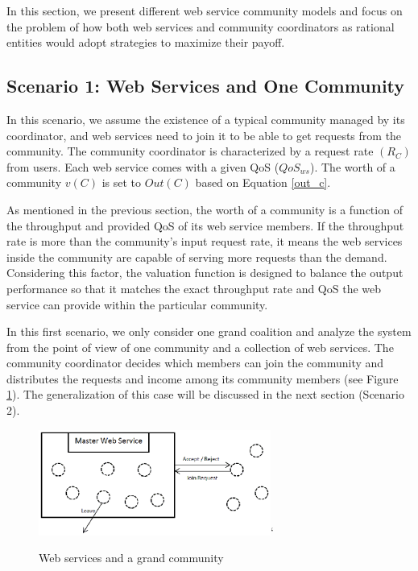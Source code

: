 \documentclass[10pt,journal,cspaper,compsoc]{IEEEtran}
\begin{document}
In this section, we present different web service community models
and focus on the problem of how both web services and community
coordinators as rational entities would adopt strategies to maximize
their payoff.

\subsection {Scenario 1: Web Services and One Community}

In this scenario, we assume the existence of a typical community
managed by its coordinator, and web services need to join it to be able
to get requests from the community. The community coordinator is
characterized by a request rate $(R_{C})$ from users. Each web
service comes with a given QoS ($QoS_{ws}$). The worth of a
community $v(C)$ is set to $Out(C)$ based on Equation \ref{out_c}.

As mentioned in the previous section, the worth of a community is
a function of the throughput and provided QoS of its web service
members. If the throughput rate is more than the community's input
request rate, it means the web services inside the community are
capable of serving more requests than the demand. Considering this
factor, the valuation function is designed to balance the output
performance so that it matches the exact throughput rate and QoS
the web service can provide within the particular community.

In this first scenario, we only consider one grand coalition and
analyze the system from the point of view of one community and a collection of web services. The community coordinator
decides which members can join
the community and distributes the requests and income among its
community members (see Figure \ref{fig_sim1}). The generalization
of this case will be discussed in the next section (Scenario 2).

\begin{figure}[!t]
\centering
\includegraphics[width=3in]{s1.eps}`
\caption{Web services and a grand community} \label{fig_sim1}
\end{figure}
\end{document}
